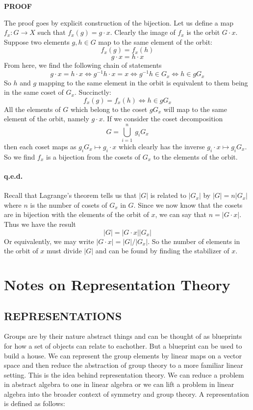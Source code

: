 \documentclass[9 pt]{report}
\begin{document}
\begin{center}
	\textbf{PROOF}
\end{center}
The proof goes by explicit construction of the bijection. Let us define a map $f_x: G\to X$ such that $f_x(g) = g\cdot x$. Clearly the image of $f_x$ is the orbit $G\cdot x$. Suppose two elements $g,h\in G$ map to the same element of the orbit:
$$ f_x(g) = f_x(h) $$
$$ g\cdot x = h\cdot x $$
From here, we find the following chain of statements
$$ g\cdot x = h\cdot x \iff g^{-1}h\cdot x = x \iff g^{-1}h\in G_x \iff h \in gG_x $$
So $h$ and $g$ mapping to the same element in the orbit is equivalent to them being in the same coset of $G_x$. Succinctly:
$$ f_x(g)=f_x(h)\iff h \in gG_x $$
All the elements of $G$ which belong to the coset $gG_x$ will map to the same element of the orbit, namely $g\cdot x$. If we consider the coset decomposition
$$ G = \bigcup_{i=1}^n\:g_i G_x $$
then each coset maps as $g_i G_x \mapsto g_i\cdot x$ which clearly has the inverse $g_i\cdot x \mapsto g_iG_x$. So we find $f_x$ is a bijection from the cosets of $G_x$ to the elements of the orbit.
\\
\\
\textbf{q.e.d.}
\\
\\
Recall that Lagrange's theorem tells us that $|G|$ is related to $|G_x|$ by $ |G| = n|G_x| $ where $n$ is the number of cosets of $G_x$ in $G$. Since we now know that the cosets are in bijection with the elements of the orbit of $x$, we can say that $n=|G\cdot x|$. Thus we have the result
$$ |G| = |G\cdot x||G_x| $$
Or equivalently, we may write $ |G\cdot x| = |G|/|G_x| $. So the number of elements in the orbit of $x$ must divide $|G|$ and can be found by finding the stabilizer of $x$. 













\chapter*{Notes on Representation Theory}
{\centering
\section*{REPRESENTATIONS}}
Groups are by their nature abstract things and can be thought of as blueprints for how a set of objects can relate to eachother. But a blueprint can be used to build a house. We can represent the group elements by linear maps on a vector space and then reduce the abstraction of group theory to a more familiar linear setting. This is the idea behind representation theory. We can reduce a problem in abstract algebra to one in linear algebra or we can lift a problem in linear algebra into the broader context of symmetry and group theory. A representation is defined as follows:
\end{document}

